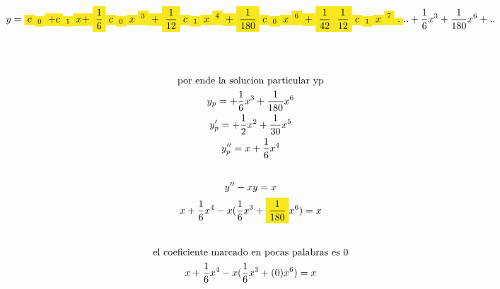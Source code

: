 \documentclass{article}
\begin{document}
\begin{gather*}
y = \text{\colorbox[RGB]{248,231,28}{$c$}}\text{\colorbox[RGB]{248,231,28}{$_{0}$}}\text{\colorbox[RGB]{248,231,28}{$+c$}}\text{\colorbox[RGB]{248,231,28}{$_{1}$}}\text{\colorbox[RGB]{248,231,28}{$x+$}}\text{\colorbox[RGB]{248,231,28}{$\frac{1}{6}$}}\text{\colorbox[RGB]{248,231,28}{$c$}}\text{\colorbox[RGB]{248,231,28}{$_{0}$}}\text{\colorbox[RGB]{248,231,28}{$x$}}\text{\colorbox[RGB]{248,231,28}{$^{3}$}}\text{\colorbox[RGB]{248,231,28}{$+$}}\text{\colorbox[RGB]{248,231,28}{$\frac{1}{12}$}}\text{\colorbox[RGB]{248,231,28}{$c$}}\text{\colorbox[RGB]{248,231,28}{$_{1}$}}\text{\colorbox[RGB]{248,231,28}{$x$}}\text{\colorbox[RGB]{248,231,28}{$^{4}$}}\text{\colorbox[RGB]{248,231,28}{$+$}}\text{\colorbox[RGB]{248,231,28}{$\frac{1}{180}$}}\text{\colorbox[RGB]{248,231,28}{$c$}}\text{\colorbox[RGB]{248,231,28}{$_{0}$}}\text{\colorbox[RGB]{248,231,28}{$x$}}\text{\colorbox[RGB]{248,231,28}{$^{6}$}}\text{\colorbox[RGB]{248,231,28}{$+$}}\text{\colorbox[RGB]{248,231,28}{$\frac{1}{42}$}}\text{\colorbox[RGB]{248,231,28}{$\frac{1}{12}$}}\text{\colorbox[RGB]{248,231,28}{$c$}}\text{\colorbox[RGB]{248,231,28}{$_{1}$}}\text{\colorbox[RGB]{248,231,28}{$ x$}}\text{\colorbox[RGB]{248,231,28}{$^{7}$}}\text{\colorbox[RGB]{248,231,28}{$.$}}..+\frac{1}{6}x^{3}+\frac{1}{180}x^{6}+.. \\
\vspace{0.5em} \\
\vspace{0.5em} \\
\text{por ende la solucion particular yp} \\
y_{p}=+\frac{1}{6}x^{3}+\frac{1}{180}x^{6} \\
y'_{p}=+\frac{1}{2}x^{2}+\frac{1}{30}x^{5} \\
y''_{p}=x+\frac{1}{6}x^{4} \\
\vspace{0.5em} \\
y''-xy=x \\
x+\frac{1}{6}x^{4}-x(\frac{1}{6}x^{3}+\text{\colorbox[RGB]{248,231,28}{$\frac{1}{180}$}}x^{6}) =x \\
\vspace{0.5em} \\
\text{el coeficiente marcado en pocas palabras es 0} \\
x+\frac{1}{6}x^{4}-x(\frac{1}{6}x^{3}+(0)x^{6}) =x
\end{gather*}
\end{document}
